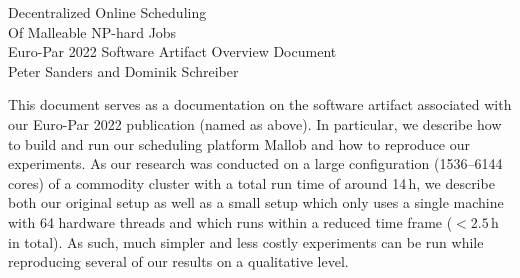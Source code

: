 \documentclass[runningheads]{article}
\numberwithin{dummy}{subsection}
\begin{document}
\begin{center}
\huge Decentralized Online Scheduling\\Of Malleable NP-hard Jobs\\[0.4cm]
\Large Euro-Par 2022 Software Artifact Overview Document\\[0.4cm]
\large Peter Sanders and Dominik Schreiber
\end{center}


%
%
%
%
%
%
%
%

\newenvironment{ttfenv}{\par\vspace{0.2cm}\ttfamily}{\par\vspace{0.2cm}}
\newenvironment{ttfenvcompact}{\par\ttfamily}{\par}

\vspace{0.3cm}

This document serves as a documentation on the software artifact associated with our Euro-Par 2022 publication (named as above).
In particular, we describe how to build and run our scheduling platform Mallob and how to reproduce our experiments.
As our research was conducted on a large configuration (1536--6144 cores) of a commodity cluster with a total run time of around 14\,h, we describe both our original setup as well as a small setup which only uses a single machine with 64 hardware threads and which runs within a reduced time frame ($<2.5$\,h in total).
As such, much simpler and less costly experiments can be run while reproducing several of our results on a qualitative level.
\end{document}
